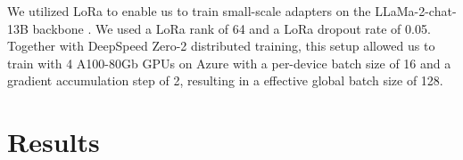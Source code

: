 \documentclass{article}
\begin{document}
We utilized LoRa to enable us to train small-scale adapters on the LLaMa-2-chat-13B backbone \cite{touvron2023}. We used a LoRa rank of 64 and a LoRa dropout rate of 0.05. Together with DeepSpeed Zero-2 distributed training, this setup allowed us to train with 4 A100-80Gb GPUs on Azure with a per-device batch size of 16 and a gradient accumulation step of 2, resulting in a effective global batch size of 128. 

\section{Results}
\end{document}
